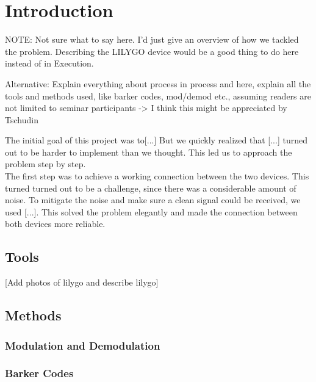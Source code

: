 \chapter{Introduction}
{NOTE: Not sure what to say here. I'd just give an overview of how we tackled the problem.
Describing the LILYGO device would be a good thing to do here instead of in Execution.

Alternative:
Explain everything about process in process and here, explain all the tools and methods used, like barker codes, mod/demod etc., assuming readers are not limited to seminar participants -> I think this might be appreciated by Tschudin}





The initial goal of this project was to[...] But we quickly realized that [...] turned out to be harder to implement than we thought. This led us to approach the problem step by step. \\

The first step was to achieve a working connection between the two devices. This turned turned out to be a challenge, since there was a considerable amount of noise. To mitigate the noise and make sure a clean signal could be received, we used [...]. This solved the problem elegantly and made the connection between both devices more reliable.

\section{Tools}
[Add photos of lilygo and describe lilygo]

\section{Methods}
\subsection{Modulation and Demodulation}
\subsection{Barker Codes}
